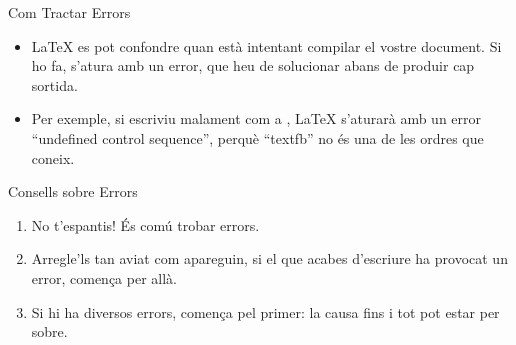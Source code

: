 \begin{frame}[fragile]{Com Tractar Errors}
\begin{itemize}
\item \LaTeX{} es pot confondre quan està intentant compilar el vostre document. 
    Si ho fa, s'atura amb un error, que heu de solucionar abans de produir cap sortida.
\item Per exemple, si escriviu malament  com a , \LaTeX{} s'aturarà amb un error 
``undefined control sequence'', perquè ``textfb'' no és una de les ordres que coneix.
\end{itemize}
\begin{block}{Consells sobre Errors}
\begin{enumerate}
\item No t'espantis! És comú trobar errors.
\item Arregle'ls tan aviat com apareguin, si el que acabes d'escriure ha provocat un error, comença per allà. 
\item Si hi ha diversos errors, comença pel primer:
la causa fins i tot pot estar per sobre.
\end{enumerate}
\end{block}
\end{frame}


